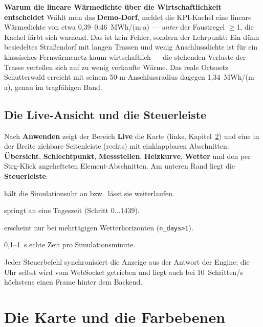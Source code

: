 \documentclass[11pt,a4paper,parskip=half]{scrreprt}
\newcommand{\ui}[1]{\textsf{\bfseries #1}}
\newenvironment{beispiel}[1][Beispiel]
  {\par\medskip{\color{bsp}\hrule height 0.8pt}\nopagebreak\smallskip
   \noindent\textbf{\textsf{\textcolor{bsp}{#1}}}\quad\ignorespaces}
  {\par\nopagebreak\smallskip{\color{bsp}\hrule height 0.8pt}\par\medskip}
\begin{document}
\begin{beispiel}[Warum die lineare Wärmedichte über die Wirtschaftlichkeit entscheidet]
Wählt man das \ui{Demo-Dorf}, meldet die KPI-Kachel eine lineare Wärmedichte
von etwa 0{,}39--0{,}46~MWh/(m$\cdot$a) --- \emph{unter} der Faustregel $\geq$1,
die Kachel färbt sich warnend. Das ist kein Fehler, sondern der Lehrpunkt: Ein
dünn besiedeltes Straßendorf mit langen Trassen und wenig Anschlussdichte ist
für ein klassisches Fernwärmenetz kaum wirtschaftlich --- die stehenden
Verluste der Trasse verteilen sich auf zu wenig verkaufte Wärme. Das reale
Ortsnetz Schutterwald erreicht mit seinem 50-m-Anschlussradius dagegen
1{,}34~MWh/(m$\cdot$a), genau im tragfähigen Band.
\end{beispiel}

\section{Die Live-Ansicht und die Steuerleiste}

Nach \ui{Anwenden} zeigt der Bereich \ui{Live} die Karte (links,
Kapitel~\ref{ch:karte}) und eine in der Breite ziehbare Seitenleiste (rechts)
mit einklappbaren Abschnitten: \ui{Übersicht}, \ui{Schlechtpunkt},
\ui{Messstellen}, \ui{Heizkurve}, \ui{Wetter} und den per Strg-Klick
angehefteten Element-Abschnitten. Am unteren Rand liegt die \textbf{Steuerleiste}:

\begin{description}[nosep]
  \item[Start/Pause] hält die Simulationsuhr an bzw.\ lässt sie weiterlaufen.
  \item[Zeit-Regler] springt an eine Tageszeit (Schritt $0\dots1439$).
  \item[Tag-Regler] erscheint nur bei mehrtägigen Wetterhorizonten
    (\texttt{n\_days>1}).
  \item[Schrittdauer] 0{,}1--1~s echte Zeit pro Simulationsminute.
\end{description}

Jeder Steuerbefehl synchronisiert die Anzeige aus der Antwort der Engine; die
Uhr selbst wird vom WebSocket getrieben und liegt auch bei 10~Schritten/s
höchstens einen Frame hinter dem Backend.

\chapter{Die Karte und die Farbebenen}
\label{ch:karte}
\end{document}

